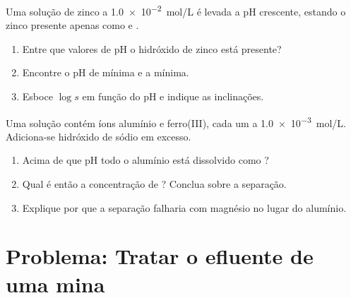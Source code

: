 \begin{exercise}[$\star\star\star$]\label{exo:b1:precipitation:11}
Uma solução de zinco a \qty{1.0e-2}{mol/L} é levada a pH crescente,
estando o zinco presente apenas como  e .
\begin{enumerate}
  \item Entre que valores de pH o hidróxido de zinco está presente?
  \item Encontre o pH de  mínima e a  mínima.
  \item Esboce $\log s$ em função do pH e indique as inclinações.
\end{enumerate}
\end{exercise}

\begin{exercise}[$\star\star\star$]\label{exo:b1:precipitation:12}
Uma solução contém íons alumínio e ferro(III), cada um a
\qty{1.0e-3}{mol/L}. Adiciona-se hidróxido de sódio em excesso.
\begin{enumerate}
  \item Acima de que pH todo o alumínio está dissolvido como ?
  \item Qual é então a concentração de ? Conclua sobre a
        separação.
  \item Explique por que a separação falharia com magnésio no lugar do
        alumínio.
\end{enumerate}
\end{exercise}

\section{Problema: Tratar o efluente de uma mina}

